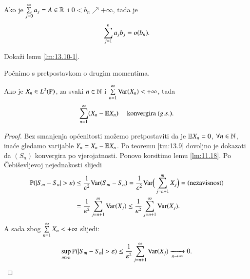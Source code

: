 \begin{lm}  \label{lm:13.10-1}
    Ako je $\sum\limits_{j = 0}^{\infty} a_j = A \in \mathbb{R}$ i $0 < b_n \nearrow +\infty$, tada je
    \begin{equation*}
        \sum\limits_{j = 1}^{n} a_j b_j = o(b_n).
    \end{equation*}
\end{lm}

\begin{zad} \label{zad:13.11}
    Doka\v zi lemu \ref{lm:13.10-1}.
\end{zad}

Po\v cnimo s pretpostavkom o drugim momentima.

\begin{tm}  \label{tm:13.12}
    Ako je $X_n \in L^2 (\mathbb{P})$, za svaki $n \in \mathbb{N}$ i $\sum\limits_{n = 1}^{\infty} \mathrm{Var} (X_n) < +\infty$, tada
    \begin{equation*}
        \sum\limits_{n = 1}^{\infty} (X_n - \mathbb{E} X_n) \quad \textnormal{ konvergira } (g.s.).
    \end{equation*}
\end{tm}

\begin{proof}
    Bez smanjenja op\' cenitosti mo\v zemo pretpostaviti da je $\mathbb{E} X_n = 0$, $\forall n \in \mathbb{N}$, ina\' ce gledamo varijable $Y_n = X_n - \mathbb{E} X_n$.
    Po teoremu \ref{tm:13.9} dovoljno je dokazati da $(S_n)$ konvergira po vjerojatnosti.
    Ponovo korsitimo lemu \ref{lm:11.18}.
    Po \v Cebi\v sevljevoj nejednakosti slijedi
    \begin{equation*}
        \begin{aligned}
            \mathbb{P}({|S_m - S_n| > \varepsilon}) &\leq \frac{1}{\varepsilon^2} \mathrm{Var} (S_m - S_n) = \frac{1}{\varepsilon^2} \mathrm{Var} \Big( \sum\limits_{j = n + 1}^{m} X_j \Big) = (\textnormal{nezavisnost})\\
            &= \frac{1}{\varepsilon^2} \sum\limits_{j = n + 1}^{m} \mathrm{Var} (X_j) \leq \frac{1}{\varepsilon^2} \sum\limits_{j = n + 1}^{\infty} \mathrm{Var} (X_j).
        \end{aligned}
    \end{equation*}
    A sada zbog $\sum\limits_{n = 1}^{\infty} X_n < +\infty$ slijedi:
    \begin{equation*}
        \sup\limits_{m > n} \mathbb{P}({|S_m - S_n| > \varepsilon}) \leq \frac{1}{\varepsilon^2} \sum\limits_{j = n + 1}^{\infty} \mathrm{Var} (X_j) \xrightarrow[n \to \infty]{} 0.
    \end{equation*}
\end{proof}

